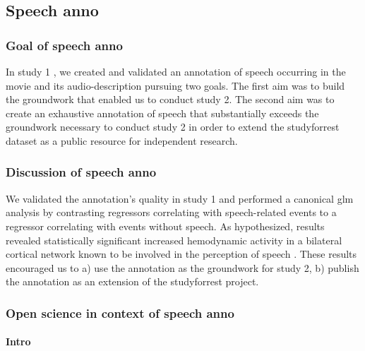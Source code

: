 \subsection{Speech anno}


\subsubsection{Goal of speech anno}

In study 1 \citep{haeusler2021speechanno}, we created and validated an
annotation of speech occurring in the movie and its audio-description pursuing
two goals.
The first aim was to build the groundwork that enabled us to conduct study 2.
The second aim was to create an exhaustive annotation of speech that
substantially exceeds the groundwork necessary to conduct study 2 in order to
extend the studyforrest dataset as a public resource for independent research.


\subsubsection{Discussion of speech anno}

We validated the annotation's quality in study 1 and performed a canonical
\ac{glm} analysis by contrasting regressors correlating with speech-related
events to a regressor correlating with events without speech.
As hypothesized, results revealed statistically significant increased
hemodynamic activity in a bilateral cortical network known to be involved in the
perception of speech \citep[e.g.,][]{friederici2011brain, wilson2008beyond}.
These results encouraged us to a) use the annotation as the groundwork for study
2, b) publish the annotation as an extension of the studyforrest project.


\subsubsection{Open science in context of speech anno}



\paragraph{Intro}

